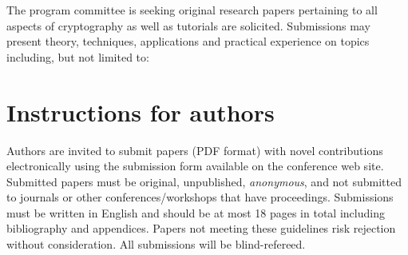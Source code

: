 \documentclass[letterpaper]{article}
\begin{document}
\begin{tabularx}{\linewidth}
  The program committee is seeking original research papers pertaining
  to all aspects of cryptography as well as tutorials are
  solicited. Submissions may present theory, techniques, applications
  and practical experience on topics including, but not limited
  to:\par{}


  \section*{Instructions for authors}

  Authors are invited to submit papers (PDF format) with novel
  contributions electronically using the submission form available on
  the conference web site.
  Submitted papers must be original, unpublished, \emph{anonymous},
  and not submitted to journals or other conferences/workshops that
  have proceedings. Submissions must be written in English and should
  be at most 18 pages in total including bibliography and
  appendices. Papers not meeting these guidelines risk rejection
  without consideration. All submissions will be
  blind-refereed.\par\smallskip


\end{tabularx}
\end{document}

